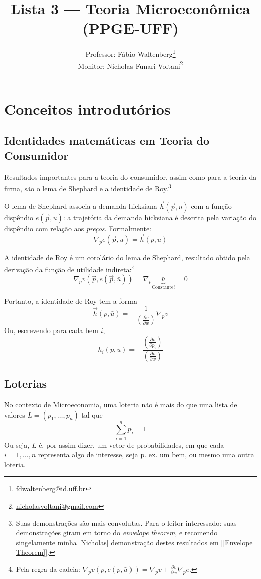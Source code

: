 \documentclass[12pt]{article}
\title{Lista 3 --- Teoria Microeconômica (PPGE-UFF)}
\author{Professor: Fábio Waltenberg\thanks{\href{mailto:fdwaltenberg@id.uff.br}{fdwaltenberg@id.uff.br}} \\Monitor: Nicholas Funari Voltani\thanks{\href{mailto:nicholasvoltani@gmail.com}{nicholasvoltani@gmail.com}}}
\date{}
\numberwithin{equation}{section}
\theoremstyle{plain}
\theoremstyle{definition}
\theoremstyle{remark}
\begin{document}
\maketitle

\section{Conceitos introdutórios}
\subsection{Identidades matemáticas em Teoria do Consumidor}
Resultados importantes para a teoria do consumidor, assim como para a teoria da firma, são o lema de Shephard e a identidade de Roy.\footnote{Suas demonstrações são mais convolutas. Para o leitor interessado: suas demonstrações giram em torno do \textit{envelope theorem}, e recomendo singelamente minha [Nicholas] demonstração destes resultados em \href{https://nicholasvoltani.github.io/Envelope-Theorem}{[[Envelope Theorem]]}.}

O lema de Shephard associa a demanda hicksiana \(\vec{h}(\vec{p}, \bar{u})\) com a função dispêndio \(e(\vec{p}, \bar{u})\): a trajetória da demanda hicksiana é descrita pela variação do dispêndio com relação aos \textit{preços}. Formalmente:
\[
\nabla_{p} {e(\vec{p}, \bar{u})} = \vec{h}(p, \bar{u}) 
\]

A identidade de Roy é um corolário do lema de Shephard, resultado obtido pela derivação da função de utilidade indireta:\footnote{Pela regra da cadeia: $\nabla_p v(p, e(p, \bar{u})) = \nabla_p v + \frac{\partial v}{\partial w} \nabla_p e$.}
\[
\nabla_{p} v\left(\vec{p}, e(\vec{p}, \bar{u})\right) = \nabla_{p} \underbrace{\bar{u}}_{\text{Constante!}} = 0
\]

Portanto, a identidade de Roy tem a forma
\[
\vec{h}(p, \bar{u}) = -\frac{1}{\left( \frac{ \partial v }{ \partial w } \right) } \nabla_{p}v
\]
Ou, escrevendo para cada bem $i$,
\[
h_i(p, \bar{u}) = -\frac{\left( \frac{ \partial v }{ \partial p_i } \right) }{\left( \frac{ \partial v }{ \partial w } \right) } 
\]


\subsection{Loterias}
No contexto de Microeconomia, uma loteria não é mais do que uma lista de valores $L = (p_1, \dots, p_n)$ tal que 
\[
\sum\limits_{i=1}^n p_i = 1 
\]
Ou seja, $L$ é, por assim dizer, um vetor de probabilidades, em que cada $i = 1, \dots, n$ representa algo de interesse, seja p. ex. um bem, ou mesmo uma outra loteria.
\end{document}
